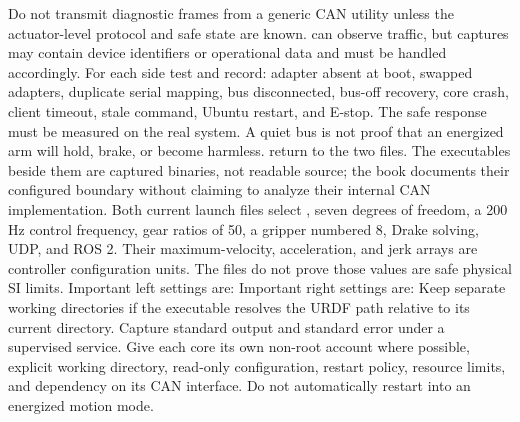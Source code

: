 {}Do not transmit diagnostic frames from a generic CAN utility unless the actuator-level protocol and safe state are known.  can observe traffic, but captures may contain device identifiers or operational data and must be handled accordingly.\markdownRendererInterblockSeparator
{}
\markdownRendererSectionEnd \markdownRendererSectionBegin
{}\markdownRendererInterblockSeparator
{}For each side test and record: adapter absent at boot, swapped adapters, duplicate serial mapping, bus disconnected, bus-off recovery, core crash, client timeout, stale command, Ubuntu restart, and E-stop. The safe response must be measured on the real system. A quiet bus is not proof that an energized arm will hold, brake, or become harmless.\markdownRendererInterblockSeparator
{}
\markdownRendererSectionEnd 
\markdownRendererSectionEnd \markdownRendererSectionBegin
{}\markdownRendererInterblockSeparator
{}\markdownRendererBlockQuoteBegin
{} return to the two  files. The executables beside them are captured binaries, not readable source; the book documents their configured boundary without claiming to analyze their internal CAN implementation.\markdownRendererBlockQuoteEnd \markdownRendererInterblockSeparator
{}Both current launch files select , seven degrees of freedom, a 200 Hz control frequency, gear ratios of 50, a gripper numbered 8, Drake solving, UDP, and ROS 2. Their maximum-velocity, acceleration, and jerk arrays are controller configuration units. The files do not prove those values are safe physical SI limits.\markdownRendererParagraphSeparator
{}Important left settings are:\markdownRendererInterblockSeparator
{}\markdownRendererInterblockSeparator
{}Important right settings are:\markdownRendererInterblockSeparator
{}\markdownRendererInterblockSeparator
{}Keep separate working directories if the executable resolves the URDF path relative to its current directory. Capture standard output and standard error under a supervised service. Give each core its own non-root account where possible, explicit working directory, read-only configuration, restart policy, resource limits, and dependency on its CAN interface. Do not automatically restart into an energized motion mode.\markdownRendererInterblockSeparator
